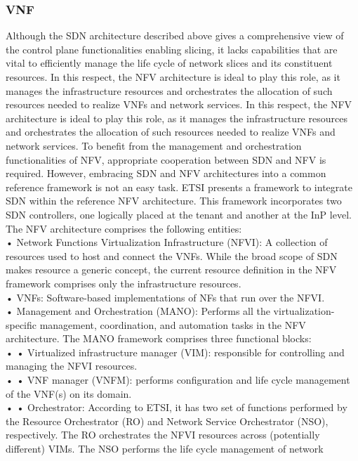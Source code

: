 \documentclass{article}
\begin{document}
\subsubsection{VNF}
Although the SDN architecture described above
gives a comprehensive view of the control plane
functionalities enabling slicing, it lacks capabilities
that are vital to efficiently manage the life cycle of
network slices and its constituent resources. In this
respect, the NFV architecture is ideal to play
this role, as it manages the infrastructure resources
and orchestrates the allocation of such resources
needed to realize VNFs and network services.
In this respect, the NFV architecture is ideal to play
this role, as it manages the infrastructure resources
and orchestrates the allocation of such resources
needed to realize VNFs and network services.
To benefit from the management and orchestration functionalities of NFV, appropriate cooperation between SDN and NFV is required.
However, embracing SDN and NFV architectures
into a common reference framework is not an
easy task. ETSI presents a framework
to integrate SDN within the reference NFV architecture. This framework incorporates two SDN
controllers, one logically placed at the tenant and
another at the InP level. The NFV architecture comprises the following
entities:\\
• Network Functions Virtualization Infrastructure (NFVI): A collection of resources used to
host and connect the VNFs. While the broad
scope of SDN makes resource a generic concept,
the current resource definition in the NFV framework comprises only the infrastructure resources.\\
• VNFs: Software-based implementations of NFs
that run over the NFVI.\\
• Management and Orchestration (MANO):
Performs all the virtualization-specific management, coordination, and automation tasks in the
NFV architecture. The MANO framework
comprises three functional blocks:\\
• • Virtualized infrastructure manager (VIM):
responsible for controlling and managing the
NFVI resources.\\
• • VNF manager (VNFM): performs configuration and life cycle management of the
VNF(s) on its domain.\\
• • Orchestrator: According to ETSI, it has two
set of functions performed by the Resource
Orchestrator (RO) and Network Service
Orchestrator (NSO), respectively. The RO
orchestrates the NFVI resources across
(potentially different) VIMs. The NSO performs the life cycle management of network
\end{document}
